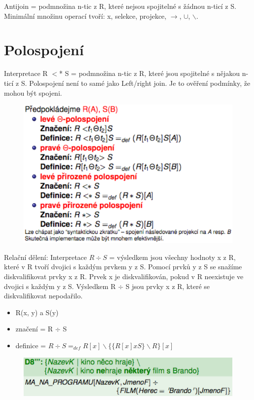 \documentclass{szzclass}
\begin{document}
Antijoin = podmnožina n-tic z R, které nejsou spojitelné s žádnou n-ticí z S. Minimální množinu operací
tvoří: x, selekce, projekce, $\rightarrow$, $\cup$, $\backslash$.

\section{Polospojení}
Interpretace R $<$* S = podmnožina n-tic z R, které jsou spojitelné s nějakou n-ticí z S. Polospojení
není to samé jako Left/right join. Je to ověření podmínky, že mohou být spojeni.
\begin{figure}[h!]
  \centering
  \includegraphics[width = \textwidth ]{topics/bi-spol-09/images/halfConnection.png}
\end{figure}
Relační dělení:
Interpretace $R \div S$ = výsledkem jsou všechny hodnoty x z R, které v R tvoří dvojici s každým prvkem y z S.
Pomocí prvků y z S se snažíme diskvalifikovat prvky x z R. Prvek x je diskvalifikován, pokud v R neexistuje ve dvojici s každým y z S.
Výsledkem R $\div$ S jsou prvky x z R, které se diskvalifikovat nepodařilo.
\begin{itemize}
  \item R(x, y) a S(y)
  \item značení = R $\div$ S
  \item definice = $R \div S =_{def} R[x] \backslash \{\{R[x] x S\} \backslash R\}[x]$
\end{itemize}

\begin{figure}[h!]
  \centering
  \includegraphics[width = \textwidth ]{topics/bi-spol-09/images/division.png}
\end{figure}
\end{document}
